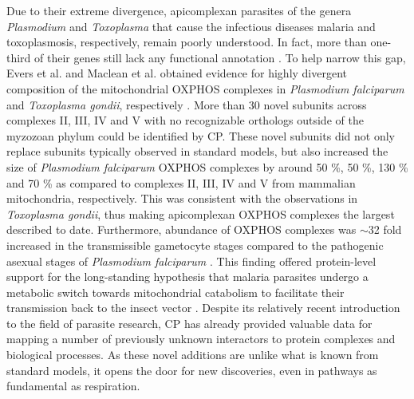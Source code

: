 Due to their extreme divergence, apicomplexan parasites of the genera \emph{Plasmodium} and \emph{Toxoplasma} that cause the infectious diseases malaria and toxoplasmosis, respectively, remain poorly understood. In fact, more than one-third of their genes still lack any functional annotation \cite{Aurrecoechea_2009, Harb_2020}. To help narrow this gap, Evers et al. and Maclean et al. obtained evidence for highly divergent composition of the mitochondrial OXPHOS complexes in \emph{Plasmodium falciparum} and \emph{Toxoplasma gondii}, respectively \cite{Evers_2021, Maclean_2021}. More than 30 novel subunits across complexes II, III, IV and V with no recognizable orthologs outside of the myzozoan phylum could be identified by CP. These novel subunits did not only replace subunits typically observed in standard models, but also increased the size of \emph{Plasmodium falciparum} OXPHOS complexes by around 50 \%, 50 \%, 130 \% and 70 \% as compared to complexes II, III, IV and V from mammalian mitochondria, respectively. This was consistent with the observations in \emph{Toxoplasma gondii}, thus making apicomplexan OXPHOS complexes the largest described to date. Furthermore, abundance of OXPHOS complexes was $\sim$32 fold increased in the transmissible gametocyte stages compared to the pathogenic asexual stages of \emph{Plasmodium falciparum} \cite{Evers_2021}. This finding offered protein-level support for the long-standing hypothesis that malaria parasites undergo a metabolic switch towards mitochondrial catabolism to facilitate their transmission back to the insect vector \cite{MacRae_2013}. Despite its relatively recent introduction to the field of parasite research, CP has already provided valuable data for mapping a number of previously unknown interactors to protein complexes and biological processes. As these novel additions are unlike what is known from standard models, it opens the door for new discoveries, even in pathways as fundamental as respiration.

